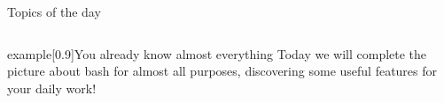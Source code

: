 
\begin{frame}
    \titlepage
\end{frame}
\begin{frame}{Topics of the day}
    \medskip
    \begin{columns}[t]
        \begin{column}{.45\textwidth}
            \hspace*{4mm}
            \begin{minipage}[t][0.45\textheight]{\textwidth}
                \tableofcontents[sections={1-3}]
            \end{minipage}
        \end{column}
        \begin{column}{.45\textwidth}
            \begin{minipage}[t][0.45\textheight]{\textwidth}
                \tableofcontents[sections={4-}]
            \end{minipage}
        \end{column}
    \end{columns}
    \vspace{6mm}
    \begin{varblock}{example}[0.9\textwidth]{You already know almost everything}
        Today we will complete the picture about bash for almost all purposes, discovering some useful features for your daily work!
    \end{varblock}
\end{frame}

